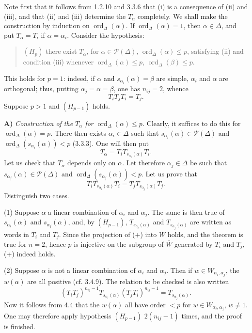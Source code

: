 Note first that it follows from 1.2.10 and 3.3.6 that (i) is a consequence of (ii) and (iii), and that (ii) and (iii) determine the $T_\alpha$ completely. We shall make the construction by induction on $\operatorname{ord}_\Delta(\alpha)$. If $\operatorname{ord}_\Delta(\alpha)=1$, then $\alpha\in\Delta$, and put $T_\alpha=T_i$ if $\alpha=\alpha_i$. Consider the hypothesis:
\begin{quote}
$(H_p)$ there exist $T_\alpha$, for $\alpha\in\mathcal P(\Delta)$, $\operatorname{ord}_\Delta(\alpha)\leq p$, satisfying (ii) and condition (iii) whenever $\operatorname{ord}_\Delta(\alpha)\leq p$, $\operatorname{ord}_\Delta(\beta)\leq p$.
\end{quote}
This holds for $p=1$: indeed, if $\alpha$ and $s_{\alpha_i}(\alpha)=\beta$ are simple, $\alpha_i$ and $\alpha$ are orthogonal; thus, putting $\alpha_j=\alpha=\beta$, one has $n_{ij}=2$, whence
\[
T_iT_jT_i=T_j.
\]
Suppose $p>1$ and $(H_{p-1})$ holds.

\textbf{A)} \emph{Construction of the $T_\alpha$ for $\operatorname{ord}_\Delta(\alpha)\leq p$.} Clearly, it suffices to do this for $\operatorname{ord}_\Delta(\alpha)=p$. There then exists $\alpha_i\in\Delta$ such that $s_{\alpha_i}(\alpha)\in\mathcal P(\Delta)$ and $\operatorname{ord}_\Delta(s_{\alpha_i}(\alpha))<p$ (3.3.3). One will then put
\begin{equation}\tag{$\star$}\label{XXI.5.eq.star}
T_\alpha=T_iT_{s_{\alpha_i}(\alpha)}T_i.
\end{equation}
Let us check that $T_\alpha$ depends only on $\alpha$. Let therefore $\alpha_j\in\Delta$ be such that $s_{\alpha_j}(\alpha)\in\mathcal P(\Delta)$ and $\operatorname{ord}_\Delta(s_{\alpha_j}(\alpha))<p$. Let us prove that
\begin{equation}\tag{+}\label{XXI.5.eq.plus}
T_iT_{s_{\alpha_i}(\alpha)}T_i=T_jT_{s_{\alpha_j}(\alpha)}T_j.
\end{equation}
Distinguish two cases.

(1) Suppose $\alpha$ a linear combination of $\alpha_i$ and $\alpha_j$. The same is then true of $s_{\alpha_i}(\alpha)$ and $s_{\alpha_j}(\alpha)$, and, by $(H_{p-1})$, $T_{s_{\alpha_i}(\alpha)}$ and $T_{s_{\alpha_j}(\alpha)}$ are written as words in $T_i$ and $T_j$. Since the projection of (+) into $W$ holds, and the theorem is true for $n=2$, hence $p$ is injective on the subgroup of $\overline W$ generated by $T_i$ and $T_j$, (+) indeed holds.

(2) Suppose $\alpha$ is not a linear combination of $\alpha_i$ and $\alpha_j$. Then if $w\in W_{\alpha_i,\alpha_j}$, the $w(\alpha)$ are all positive (cf. 3.4.9). The relation to be checked is also written
\begin{equation}\tag{++}\label{XXI.5.eq.plusplus}
(T_iT_j)^{n_{ij}-1}T_{s_{\alpha_i}(\alpha)}(T_jT_i)^{n_{ij}-1}=T_{s_{\alpha_j}(\alpha)}.
\end{equation}
Now it follows from 4.4 that the $w(\alpha)$ all have order $<p$ for $w\in W_{\alpha_i,\alpha_j}$, $w\ne1$. One may therefore apply hypothesis $(H_{p-1})$ $2(n_{ij}-1)$ times, and the proof is finished.

